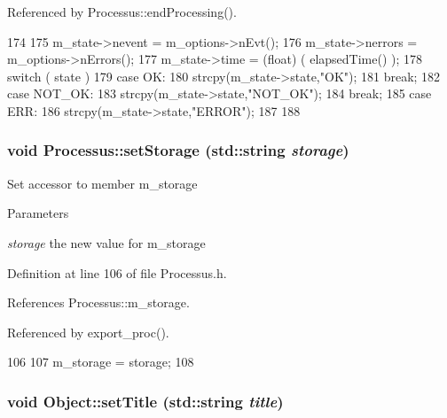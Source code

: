 Referenced by Processus::endProcessing().


\begin{DoxyCode}
174                                      {
175   m_state->nevent  = m_options->nEvt();
176   m_state->nerrors = m_options->nErrors();
177   m_state->time    = (float) ( elapsedTime() );
178   switch ( state ){
179   case OK:
180     strcpy(m_state->state,"OK");
181     break;
182   case NOT_OK:
183     strcpy(m_state->state,"NOT_OK");
184     break;
185   case ERR:
186     strcpy(m_state->state,"ERROR");
187   }
188 }
\end{DoxyCode}
\hypertarget{classProcessus_ad57a29b33f9021eda9f6929136f1784f}{
\subsubsection[{setStorage}]{\setlength{\rightskip}{0pt plus 5cm}void Processus::setStorage (std::string {\em storage})}}
\label{classProcessus_ad57a29b33f9021eda9f6929136f1784f}
Set accessor to member m\_\-storage 
\begin{DoxyParams}{Parameters}
\item[{\em storage}]the new value for m\_\-storage \end{DoxyParams}


Definition at line 106 of file Processus.h.

References Processus::m\_\-storage.

Referenced by export\_\-proc().


\begin{DoxyCode}
106                                       {
107     m_storage = storage;
108   }
\end{DoxyCode}
\hypertarget{classObject_a89557dbbad5bcaa02652f5d7fa35d20f}{
\subsubsection[{setTitle}]{\setlength{\rightskip}{0pt plus 5cm}void Object::setTitle (std::string {\em title})}}
\label{classObject_a89557dbbad5bcaa02652f5d7fa35d20f}


